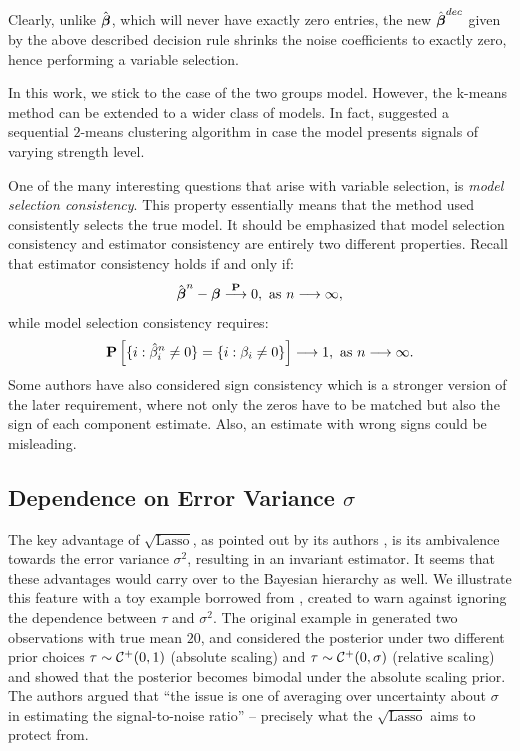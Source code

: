 \documentclass[10pt]{article}
\def\sql{$\sqrt{\text{Lasso}}$}
\begin{document}
Clearly, unlike $\hat{\boldsymbol{\beta}}$, which will never have exactly zero entries, the new $\hat{\boldsymbol{\beta}}^{dec}$ given by the above described decision rule shrinks the noise coefficients to exactly zero, hence performing a variable selection.

In this work, we stick to the case of the two groups model. However, the k-means method can be extended to a wider class of models. In fact, \citet{li2017variable} suggested a sequential $2$-means clustering algorithm in case the model presents signals of varying strength level.

One of the many interesting questions that arise with variable selection, is \textit{model selection consistency}. This property essentially means that the method used consistently selects the true model. It should be emphasized that model selection consistency and estimator consistency are entirely two different properties. Recall that estimator consistency holds if and only if:\[ \hat{\boldsymbol{\beta}}^{n} -  \boldsymbol{\beta} \stackrel{{\bf P}}{\longrightarrow}0, \ \text{as } n\longrightarrow \infty,  \]
while model selection consistency requires:
\[ \P\left[ \lbrace i : \hat{\beta}_i^{n} \neq 0 \rbrace = \lbrace i : \beta_i \neq 0\rbrace \right] \longrightarrow 1, \ \text{as } n\longrightarrow \infty. \]
Some authors have also considered sign consistency which is a stronger version of the later requirement, where not only the zeros have to be matched but also the sign of each component estimate. Also, an estimate with wrong signs could be misleading. 



\subsection{Dependence on Error Variance $\sigma$}

The key advantage of \sql{}, as pointed out by its authors \citep{belloni2011square}, is its ambivalence towards the error variance $\sigma^2$, resulting in an invariant estimator. It seems that these advantages would carry over to the Bayesian hierarchy as well. We illustrate this feature with a toy example borrowed from \citet{polson2010shrink}, created to warn against ignoring the dependence between $\tau$ and $\sigma^2$. The original example in \citet{polson2010shrink} generated two observations with true mean $20$, and considered the posterior under two different prior choices $\tau \sim \mathcal{C}^{+}(0,1)$ (absolute scaling) and $\tau \sim \mathcal{C}^{+}(0,\sigma)$ (relative scaling) and showed that the posterior becomes bimodal under the absolute scaling prior. The authors argued that ``the issue is one of averaging over uncertainty about $\sigma$ in estimating the signal-to-noise ratio'' -- precisely what the \sql{} aims to protect from. 
\end{document}
